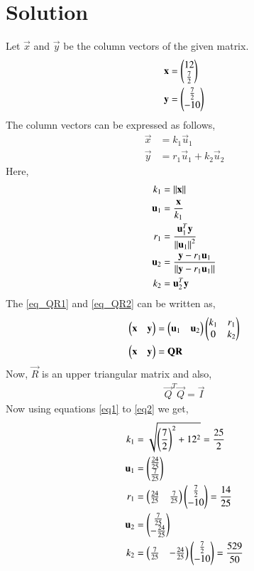 \documentclass[journal,12pt,twocolumn]{IEEEtran}
\begin{document}
\section{\textbf{Solution}}
Let $\vec{x}$ and $\vec{y}$ be the column vectors of the given matrix.
\begin{align}
    \mathbf{x} &= \begin{pmatrix}12 \\\frac{7}{2} \end{pmatrix}\\
    \mathbf{y} &= \begin{pmatrix}\frac{7}{2} \\ -10\end{pmatrix}
\end{align}
The column vectors can be expressed as follows,
\begin{align}
    \vec{x} &= k_1\vec{u}_1\label{eq_QR1}\\
    \vec{y} &= r_1\vec{u}_1+k_2\vec{u}_2\label{eq_QR2}
\end{align}
Here, 
\begin{align}
    k_1 &= \left\lVert\mathbf{x}\right\rVert\label{eq1}\\
    \mathbf{u}_1 &= \frac{\mathbf{x}}{k_1}\\
    r_1 &= \frac{\mathbf{u}_1^T\mathbf{y}}{\left\lVert\mathbf{u}_1\right\rVert^2}\\
    \mathbf{u}_2 &= \frac{\mathbf{y} - r_1 \mathbf{u}_1}{\left\lVert\mathbf{y} - r_1 \mathbf{u}_1\right\rVert}\\
    k_2 &= {\mathbf{u}_2^T\mathbf{y}}\label{eq2}
\end{align}
The \eqref{eq_QR1} and \eqref{eq_QR2} can be written as, 
\begin{align}
\begin{pmatrix}\mathbf{x} & \mathbf{y}\end{pmatrix} &= \begin{pmatrix}\mathbf{u}_1 & \mathbf{u}_2\end{pmatrix}\begin{pmatrix}k_1 & r_1 \\ 0 & k_2\end{pmatrix}\label{QRMain}\\
\begin{pmatrix}\mathbf{x} & \mathbf{y}\end{pmatrix} &= \mathbf{Q}\mathbf{R}
\end{align}
Now, $\vec{R}$ is an upper triangular matrix and also,
\begin{align}
\vec{Q}^T\vec{Q}=\vec{I}
\end{align}
Now using equations \eqref{eq1} to \eqref{eq2} we get, 
\begin{align}
    k_1 &= \sqrt{\left(\frac{7}{2}\right)^2+12^2} = \frac{25}{2}\label{eqval1}\\ 
    \mathbf{u}_1 &= \begin{pmatrix}\frac{24}{25} \\ \frac{7}{25}\end{pmatrix} \\
    r_1 &= \begin{pmatrix}\frac{24}{25}&\frac{7}{25}\end{pmatrix}\begin{pmatrix}\frac{7}{2}\\-10\end{pmatrix} = \frac{14}{25}\\ 
    \mathbf{u}_2 &= \begin{pmatrix}\frac{7}{25} \\ -\frac{24}{25}\end{pmatrix} \\
    k_2 &= \begin{pmatrix}\frac{7}{25}&-\frac{24}{25}\end{pmatrix}\begin{pmatrix}\frac{7}{2}\\-10\end{pmatrix} = \frac{529}{50}\label{eqval2} 
\end{align}
\end{document}
